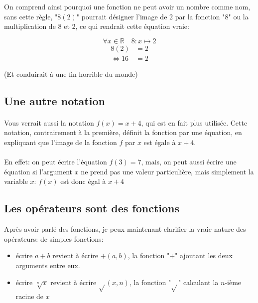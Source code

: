 \documentclass[a4paper]{book}
\begin{document}
    On comprend ainsi pourquoi une fonction ne peut avoir un nombre comme nom, sans cette règle, "$8(2)$" pourrait désigner l'image de 2 par la fonction "8" ou la multiplication de 8 et 2, ce qui rendrait cette équation vraie:
    
    $$\forall x \in \mathds{R}\quad 8:x\mapsto 2$$
    \begin{equation*}
        \begin{split}
        8(2) &= 2 \\
        \iff 16 &= 2
        \end{split}
    \end{equation*}
    
    (Et conduirait à une fin horrible du monde)
    
    \subsection{Une autre notation}
    \paragraph{}
    Vous verrait aussi la notation $f(x) = x + 4$, qui est en fait plus utilisée. Cette notation, contrairement à la première, définit la fonction par une équation, en expliquant que l'image de la fonction $f$ par $x$ est égale à $x + 4$.
    \paragraph{}
    En effet: on peut écrire l'équation $f(3) = 7$, mais, on peut aussi écrire une équation si l'argument $x$ ne prend pas une valeur particulière, mais simplement la variable $x$: $f(x)$ est donc égal à $x + 4$
    
    \subsection{Les opérateurs sont des fonctions}
    Après avoir parlé des fonctions, je peux maintenant clarifier la vraie nature des opérateurs: de simples fonctions:
    
    \begin{itemize}
        \item écrire $a + b$ revient à écrire $+(a, b)$, la fonction "+" ajoutant les deux arguments entre eux.
        \item écrire $\sqrt[n]{x}$ revient à écrire $\sqrt{}(x, n)$, la fonction "$\sqrt{}$" calculant la $n$-ième racine de $x$
    \end{itemize}
    
\end{document}
